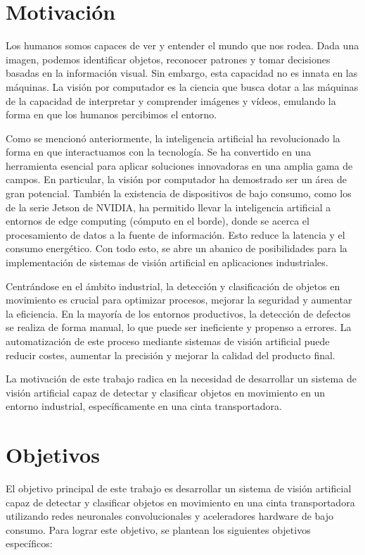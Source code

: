 \documentclass[11pt,spanish,listoffigures,listoftables]{tfgetsinf}
\begin{document}
\section{Motivaci\'on} \label{sec:motivacion}

Los humanos somos capaces de ver y entender el mundo que nos rodea. Dada una imagen, podemos identificar objetos, reconocer patrones y tomar decisiones basadas en la información visual. Sin embargo, esta capacidad no es innata en las máquinas. La visión por computador es la ciencia que busca dotar a las máquinas de la capacidad de interpretar y comprender imágenes y vídeos, emulando la forma en que los humanos percibimos el entorno.

Como se mencionó anteriormente, la inteligencia artificial ha revolucionado la forma en que interactuamos con la tecnología. Se ha convertido en una herramienta esencial para aplicar soluciones innovadoras en una amplia gama de campos. En particular, la visión por computador ha demostrado ser un área de gran potencial. También la existencia de dispositivos de bajo consumo, como los de la serie Jetson de NVIDIA, ha permitido llevar la inteligencia artificial a entornos de edge computing (cómputo en el borde), donde se acerca el procesamiento de datos a la fuente de información. Esto reduce la latencia y el consumo energético. Con todo esto, se abre un abanico de posibilidades para la implementación de sistemas de visión artificial en aplicaciones industriales.

Centrándose en el ámbito industrial, la detección y clasificación de objetos en movimiento es crucial para optimizar procesos, mejorar la seguridad y aumentar la eficiencia. En la mayoría de los entornos productivos, la detección de defectos se realiza de forma manual, lo que puede ser ineficiente y propenso a errores. La automatización de este proceso mediante sistemas de visión artificial puede reducir costes, aumentar la precisión y mejorar la calidad del producto final.


La motivación de este trabajo radica en la necesidad de desarrollar un sistema de visión artificial capaz de detectar y clasificar objetos en movimiento en un entorno industrial, específicamente en una cinta transportadora.


\section{Objetivos} \label{sec:objetivos}

El objetivo principal de este trabajo es desarrollar un sistema de visión artificial capaz de detectar y clasificar objetos en movimiento en una cinta transportadora utilizando redes neuronales convolucionales y aceleradores hardware de bajo consumo. Para lograr este objetivo, se plantean los siguientes objetivos específicos:
\end{document}
